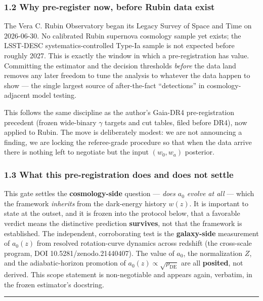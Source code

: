 \documentclass[
]{article}
\begin{document}
\subsubsection{1.2 Why pre-register now, before Rubin data
exist}\label{why-pre-register-now-before-rubin-data-exist}

The Vera C. Rubin Observatory began its Legacy Survey of Space and Time
on 2026-06-30. No calibrated Rubin supernova cosmology sample yet
exists; the LSST-DESC systematics-controlled Type-Ia sample is not
expected before roughly 2027. This is exactly the window in which a
pre-registration has value. Committing the estimator and the decision
thresholds \emph{before} the data land removes any later freedom to tune
the analysis to whatever the data happen to show --- the single largest
source of after-the-fact ``detections'' in cosmology-adjacent model
testing.

This follows the same discipline as the author's Gaia-DR4
pre-registration precedent (frozen wide-binary \(\gamma\) targets and
cut tables, filed before DR4), now applied to Rubin. The move is
deliberately modest: we are not announcing a finding, we are locking the
referee-grade procedure so that when the data arrive there is nothing
left to negotiate but the input \((w_0,w_a)\) posterior.

\subsubsection{1.3 What this pre-registration does and does not
settle}\label{what-this-pre-registration-does-and-does-not-settle}

This gate settles the \textbf{cosmology-side} question --- \emph{does
\(a_0\) evolve at all} --- which the framework \emph{inherits} from the
dark-energy history \(w(z)\). It is important to state at the outset,
and it is frozen into the protocol below, that a favorable verdict means
the distinctive prediction \textbf{survives}, not that the framework is
established. The independent, corroborating test is the
\textbf{galaxy-side} measurement of \(a_0(z)\) from resolved
rotation-curve dynamics across redshift (the cross-scale program, DOI
10.5281/zenodo.21440407). The value of \(a_0\), the normalization \(Z\),
and the adiabatic-horizon promotion of
\(a_0(z)\propto\sqrt{\rho_\mathrm{DE}}\) are all \textbf{posited}, not
derived. This scope statement is non-negotiable and appears again,
verbatim, in the frozen estimator's docstring.

\begin{center}\rule{0.5\linewidth}{0.5pt}\end{center}
\end{document}
